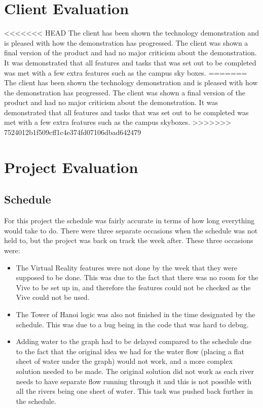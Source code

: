 \section{Client Evaluation}
<<<<<<< HEAD
	The client has been shown the technology demonstration and is pleased with how the demonstration has progressed. The client was shown a final version of the product and had no major criticism about the demonstration. It was demonstrated that all features and tasks that was set out to be completed was met with a few extra features such as the campus sky boxes.
=======
	The client has been shown the technology demonstration and is pleased with how the demonstration has progressed. The client was shown a final version of the product and had no major criticism about the demonstration. It was demonstrated that all features and tasks that was set out to be completed was met with a few extra features such as the campus skyboxes.
>>>>>>> 7524012b1f509cff1c4e374fd07106dbad642479

\section{Project Evaluation}
\subsection{Schedule}
	For this project the schedule was fairly accurate in terms of how long everything would take to do. There were three separate occasions when the schedule was not held to, but the project was back on track the week after. These three occasions were:
	\begin{itemize}
		\item The Virtual Reality features were not done by the week that they were supposed to be done. This was due to the fact that there was no room for the Vive to be set up in, and therefore the features could not be checked as the Vive could not be used.
		\item The Tower of Hanoi logic was also not finished in the time designated by the schedule. This was due to a bug being in the code that was hard to debug.
		\item Adding water to the graph had to be delayed compared to the schedule due to the fact that the original idea we had for the water flow (placing a flat sheet of water under the graph) would not work, and a more complex solution needed to be made. The original solution did not work as each river needs to have separate flow running through it and this is not possible with all the rivers being one sheet of water. This task was pushed back further in the schedule.
	\end{itemize}

